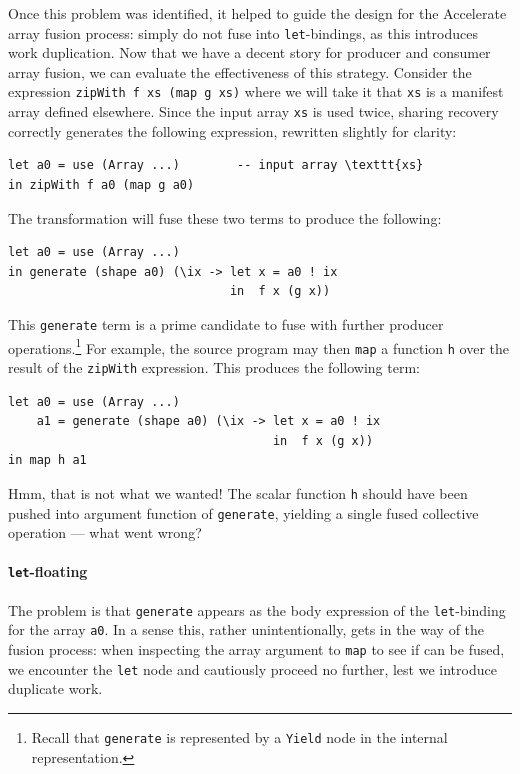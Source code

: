 Once this problem was identified, it helped to guide the design for the
Accelerate array fusion process: simply do not fuse into \texttt{let}-bindings,
as this introduces work duplication. Now that we have a decent story for
producer and consumer array fusion, we can evaluate the effectiveness of this
strategy. Consider the expression \lstinline[style=inline]{zipWith f xs (map g xs)}
where we will take it that \texttt{xs} is a manifest array defined elsewhere.
Since the input array \texttt{xs} is used twice, sharing recovery correctly
generates the following expression, rewritten slightly for clarity:
%
\begin{lstlisting}[style=haskell]
let a0 = use (Array ...)        -- input array \texttt{xs}
in zipWith f a0 (map g a0)
\end{lstlisting}
%
The transformation will fuse these two terms to produce the following:
%
\begin{lstlisting}[style=haskell]
let a0 = use (Array ...)
in generate (shape a0) (\ix -> let x = a0 ! ix
                               in  f x (g x))
\end{lstlisting}
%
This \texttt{generate} term is a prime candidate to fuse with further producer
operations.\footnote{Recall that \texttt{generate} is represented by a
\texttt{Yield} node in the internal representation.} For example, the source
program may then \texttt{map} a function \texttt{h} over the result of the
\texttt{zipWith} expression. This produces the following term:
%
\begin{lstlisting}[style=haskell]
let a0 = use (Array ...)
    a1 = generate (shape a0) (\ix -> let x = a0 ! ix
                                     in  f x (g x))
in map h a1
\end{lstlisting}
%
Hmm, that is not what we wanted! The scalar function \texttt{h} should have been
pushed into argument function of \texttt{generate}, yielding a single fused
collective operation --- what went wrong?

\paragraph{\texttt{\bf let}-floating}

The problem is that \texttt{generate} appears as the body expression of the
\texttt{let}-binding for the array \texttt{a0}. In a sense this, rather
unintentionally, gets in the way of the fusion process: when inspecting the
array argument to \texttt{map} to see if can be fused, we encounter the
\texttt{let} node and cautiously proceed no further, lest we introduce duplicate
work.


